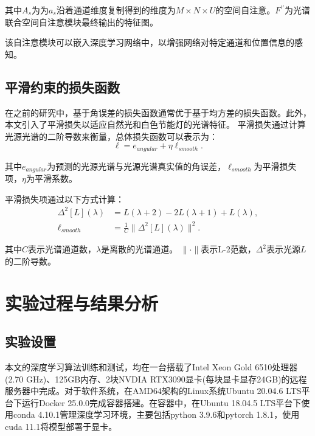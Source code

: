 \documentclass[
    type = master, %
    degree = academic,        %
    decl-page,  %
  ]{njuthesis}
\begin{document}
其中$A_s$为为$a_s$沿着通道维度复制得到的维度为$M \times N \times U$的空间自注意。$F^{\prime\prime}$为光谱联合空间自注意模块最终输出的特征图。

该自注意模块可以嵌入深度学习网络中，以增强网络对特定通道和位置信息的感知。
\subsection{平滑约束的损失函数}
在之前的研究中，基于角误差的损失函数通常优于基于均方差的损失函数。此外，本文引入了平滑损失以适应自然光和白色节能灯的光谱特征。 平滑损失通过计算光源光谱的二阶导数来衡量，总体损失函数可以表示为：
\begin{equation}\label{loss}
\ell  = {e_{angular}} + \eta {\ell
_{smooth}}.
\end{equation}

其中${e_{angular}}$为预测的光源光谱与光源光谱真实值的角误差，$\ell_{smooth}$为平滑损失项，$\eta$为平滑系数。

平滑损失项通过以下方式计算：
\begin{equation}\label{smooth loss}
\begin{align}
{\Delta ^2}[L](\lambda) &= L(\lambda  + 2)-2L(\lambda  + 1) + L(\lambda),\\
    \ell_{smooth} &=
\frac{1}{C}\|{{\Delta ^2}[L](\lambda)}\|^2.
\end{align}
\end{equation}

其中$C$表示光谱通道数，$\lambda$是离散的光谱通道。 $\|\cdot\|$表示L-2范数，${\Delta ^2}$表示光源$L$的二阶导数。

\section{实验过程与结果分析}
\subsection{实验设置 }
本文的深度学习算法训练和测试，均在一台搭载了Intel Xeon Gold 6510处理器(2.70 GHz)、125GB内存、2块NVDIA RTX3090显卡(每块显卡显存24GB)的远程服务器中完成。对于软件系统，在AMD64架构的Linux系统Ubuntu 20.04.6 LTS平台下运行Docker 25.0.0完成容器搭建。在容器中，在Ubuntu 18.04.5 LTS平台下使用conda 4.10.1管理深度学习环境，主要包括python 3.9.6和pytorch 1.8.1，使用cuda 11.1将模型部署于显卡。
\end{document}
